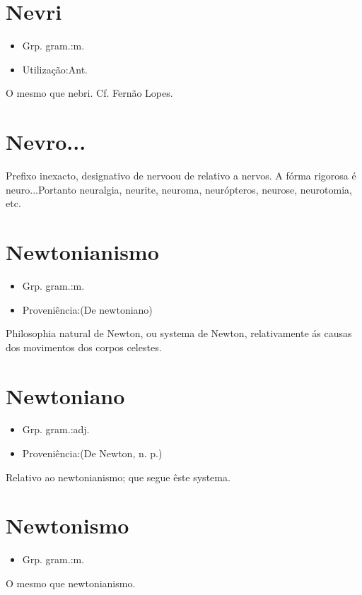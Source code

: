 \section{Nevri}
\begin{itemize}
\item {Grp. gram.:m.}
\end{itemize}
\begin{itemize}
\item {Utilização:Ant.}
\end{itemize}
O mesmo que \textunderscore nebri\textunderscore . Cf. Fernão Lopes.
\section{Nevro...}
Prefixo inexacto, designativo de \textunderscore nervo\textunderscore  ou de relativo a \textunderscore nervos\textunderscore .
A fórma rigorosa é \textunderscore neuro...\textunderscore  Portanto \textunderscore neuralgia\textunderscore , \textunderscore neurite\textunderscore , \textunderscore neuroma\textunderscore , \textunderscore neurópteros\textunderscore , \textunderscore neurose\textunderscore , \textunderscore neurotomia\textunderscore , etc.
\section{Newtonianismo}
\begin{itemize}
\item {Grp. gram.:m.}
\end{itemize}
\begin{itemize}
\item {Proveniência:(De \textunderscore newtoniano\textunderscore )}
\end{itemize}
Philosophia natural de Newton, ou systema de Newton, relativamente ás causas dos movimentos dos corpos celestes.
\section{Newtoniano}
\begin{itemize}
\item {Grp. gram.:adj.}
\end{itemize}
\begin{itemize}
\item {Proveniência:(De \textunderscore Newton\textunderscore , n. p.)}
\end{itemize}
Relativo ao newtonianismo; que segue êste systema.
\section{Newtonismo}
\begin{itemize}
\item {Grp. gram.:m.}
\end{itemize}
O mesmo que \textunderscore newtonianismo\textunderscore .

